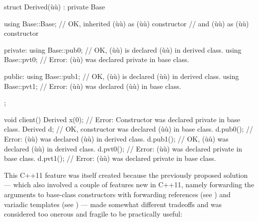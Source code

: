 \begin{emcppslisting}[language=C++]
struct Derived(ù{\footnotemark}ù) : private Base
{
    using Base::Base;  // OK, inherited (ù{}ù) as (ù{}ù) constructor
                       // and (ù{}ù) as (ù{}ù) constructor

private:
    using Base::pub0;  // OK, (ù{}ù) is declared (ù{}ù) in derived class.
    using Base::pvt0;  // Error: (ù{}ù) was declared private in base class.

public:
    using Base::pub1;  // OK, (ù{}ù) is declared (ù{}ù) in derived class.
    using Base::pvt1;  // Error: (ù{}ù) was declared (ù{}ù) in base class.
};

void client()
{
     Derived x(0);  // Error: Constructor was declared private in base class.
     Derived d;     // OK, constructor was declared (ù{}ù) in base class.
     d.pub0();      // Error: (ù{}ù) was declared (ù{}ù) in derived class.
     d.pub1();      // OK, (ù{}ù) was declared (ù{}ù) in derived class.
     d.pvt0();      // Error: (ù{}ù) was declared private in base class.
     d.pvt1();      // Error: (ù{}ù) was declared private in base class.
}
\end{emcppslisting}
{\cprotect{}}
    
\noindent This C++11 feature was itself created because the previously proposed
solution --- which also involved a couple of features new in C++11, namely
forwarding the arguments to base-class constructors with
forwarding references (see ) 
and variadic
templates (see ) 
--- made somewhat different tradeoffs and was
considered too onerous and fragile to be practically useful:

